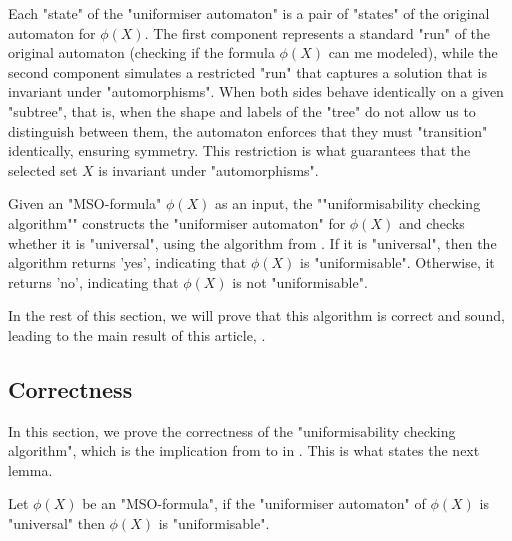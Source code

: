 \documentclass[a4paper,UKenglish,cleveref, autoref, thm-restate]{lipics-v2021}
\begin{document}
Each "state" of the "uniformiser automaton" is a pair of "states" of the original automaton for $\phi(X)$.
The first component represents a standard "run" of the original automaton (checking if the formula $\phi(X)$
can me modeled), while the second component simulates a restricted "run" that captures a solution that is invariant under "automorphisms".
When both sides behave identically on a given "subtree", that is, when the shape and labels of the "tree" do not allow
us to distinguish between them, the automaton enforces that they must "transition" identically, ensuring symmetry. This restriction
is what guarantees that the selected set $X$ is invariant under "automorphisms".

\begin{definition}
	\AP Given an "MSO-formula" $\phi(X)$ as an input, the ""uniformisability checking algorithm"" constructs the "uniformiser automaton" for $\phi(X)$
	and checks whether it is "universal", using the algorithm from . If it is "universal", then the algorithm returns 'yes', indicating
	that $\phi(X)$ is "uniformisable". Otherwise, it returns 'no', indicating that $\phi(X)$ is not "uniformisable".
\end{definition}

In the rest of this section, we will prove that this algorithm is correct and sound, leading to the main result of this article, .

\subsection{Correctness}\label{section:correctness}

In this section, we prove the correctness of the "uniformisability checking algorithm", which is the
implication from  to   in .
This is what states the next lemma.

\begin{lemma}\label{lemma:universal-implies-uniformisable}
	Let $\phi(X)$ be an "MSO-formula", if the "uniformiser automaton" of $\phi(X)$ is "universal" then $\phi(X)$ is "uniformisable".
\end{lemma}
\end{document}

